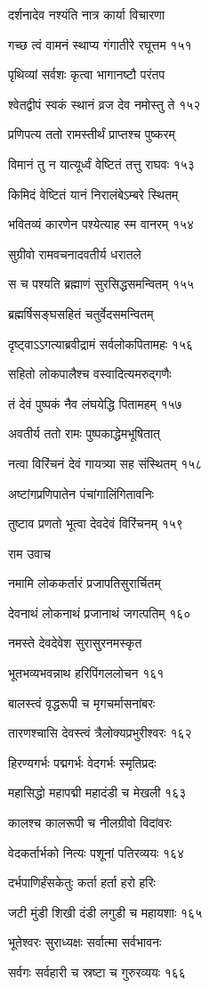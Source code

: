 दर्शनादेव नश्यंति नात्र कार्या विचारणा

गच्छ त्वं वामनं स्थाप्य गंगातीरे रघूत्तम १५१

पृथिव्यां सर्वशः कृत्वा भागानष्टौ परंतप

श्वेतद्वीपं स्वकं स्थानं व्रज देव नमोस्तु ते १५२

प्रणिपत्य ततो रामस्तीर्थं प्राप्तश्च पुष्करम्

विमानं तु न यात्यूर्ध्वं वेष्टितं तत्तु राघवः १५३

किमिदं वेष्टितं यानं निरालंबेऽम्बरे स्थितम्

भवितव्यं कारणेन पश्येत्याह स्म वानरम् १५४

सुग्रीवो रामवचनादवतीर्य धरातले

स च पश्यति ब्रह्माणं सुरसिद्धसमन्वितम् १५५

ब्रह्मर्षिसङ्घसहितं चतुर्वेदसमन्वितम्

दृष्ट्वाऽऽगत्याब्रवीद्रामं सर्वलोकपितामहः १५६

सहितो लोकपालैश्च वस्वादित्यमरुद्गणैः

तं देवं पुष्पकं नैव लंघयेद्धि पितामहम् १५७

अवतीर्य ततो रामः पुष्पकाद्धेमभूषितात्

नत्वा विरिंचनं देवं गायत्र्या सह संस्थितम् १५८

अष्टांगप्रणिपातेन पंचांगालिंगितावनिः

तुष्टाव प्रणतो भूत्वा देवदेवं विरिंचनम् १५९

राम उवाच

नमामि लोककर्तारं प्रजापतिसुरार्चितम्

देवनाथं लोकनाथं प्रजानाथं जगत्पतिम् १६०

नमस्ते देवदेवेश सुरासुरनमस्कृत

भूतभव्यभवन्नाथ हरिपिंगललोचन १६१

बालस्त्वं वृद्धरूपी च मृगचर्मासनांबरः

तारणश्चासि देवस्त्वं त्रैलोक्यप्रभुरीश्वरः १६२

हिरण्यगर्भः पद्मगर्भः वेदगर्भः स्मृतिप्रदः

महासिद्धो महापद्मी महादंडी च मेखली १६३

कालश्च कालरूपी च नीलग्रीवो विदांवरः

वेदकर्तार्भको नित्यः पशूनां पतिरव्ययः १६४

दर्भपाणिर्हंसकेतुः कर्ता हर्ता हरो हरिः

जटी मुंडी शिखी दंडी लगुडी च महायशाः १६५

भूतेश्वरः सुराध्यक्षः सर्वात्मा सर्वभावनः

सर्वगः सर्वहारी च स्रष्टा च गुरुरव्ययः १६६

